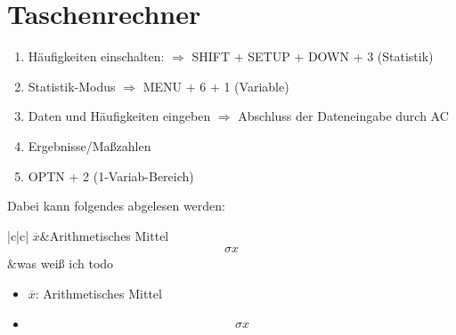 \documentclass[a4paper,10pt]{scrartcl}
\begin{document}
\section{Taschenrechner}
\begin{enumerate}
    \item Häufigkeiten einschalten:
    $\Rightarrow$ SHIFT + SETUP + DOWN + 3 (Statistik)
    \item Statistik-Modus
    $\Rightarrow$ MENU + 6 + 1 (Variable)
    \item Daten und Häufigkeiten eingeben
    $\Rightarrow$ Abschluss der Dateneingabe durch AC
    \item Ergebnisse/Maßzahlen
    \item OPTN + 2 (1-Variab-Bereich)
\end{enumerate}
Dabei kann folgendes abgelesen werden:
\begin{table}[h]
    \begin{tabular}{|c|c|}
$\overline{x}$&Arithmetisches Mittel 
\begin{eqnarray}\sigma x
\end{eqnarray}&was weiß ich todo
    \end{tabular}
\end{table}
\begin{itemize}
    \item $\overline{x}$: Arithmetisches Mittel \newline
    \item \begin{eqnarray} \sigma x\end{eqnarray}
\end{itemize}
\end{document}
